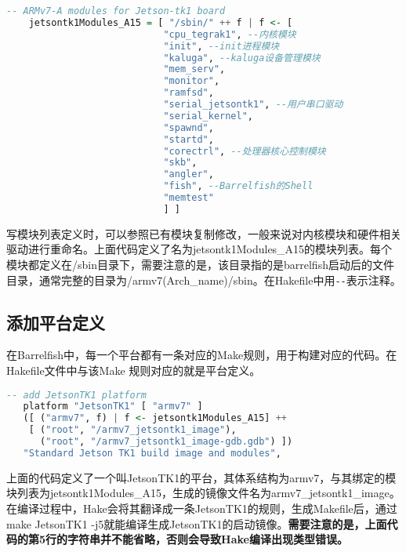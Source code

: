 \documentclass[a4paper, 12pt]{report}
\begin{document}
    \begin{lstlisting}[language = Haskell]
    -- ARMv7-A modules for Jetson-tk1 board 
    jetsontk1Modules_A15 = [ "/sbin/" ++ f | f <- [
                            "cpu_tegrak1", --内核模块
                            "init", --init进程模块
                            "kaluga", --kaluga设备管理模块
                            "mem_serv",
                            "monitor",
                            "ramfsd",
                            "serial_jetsontk1", --用户串口驱动
                            "serial_kernel",
                            "spawnd",
                            "startd",
                            "corectrl", --处理器核心控制模块
                            "skb",
                            "angler",
                            "fish", --Barrelfish的Shell
                            "memtest"
                            ] ] 
    \end{lstlisting}
    
    写模块列表定义时，可以参照已有模块复制修改，一般来说对内核模块和硬件相关驱动进行重命名。上面代码定义了名为jetsontk1Modules\_A15的模块列表。每个模块都定义在/sbin目录下，需要注意的是，该目录指的是barrelfish启动后的文件目录，通常完整的目录为/armv7(Arch\_name)/sbin。在Hakefile中用\lstinline|--|表示注释。
    
    \subsection{添加平台定义}
    
    在Barrelfish中，每一个平台都有一条对应的Make规则，用于构建对应的代码。在Hakefile文件中与该Make
    规则对应的就是平台定义。
    
	\begin{lstlisting}[language = Haskell]
   -- add JetsonTK1 platform
   platform "JetsonTK1" [ "armv7" ]
   ([ ("armv7", f) | f <- jetsontk1Modules_A15] ++
    [ ("root", "/armv7_jetsontk1_image"),
      ("root", "/armv7_jetsontk1_image-gdb.gdb") ])
   "Standard Jetson TK1 build image and modules",
    \end{lstlisting}
    
    上面的代码定义了一个叫JetsonTK1的平台，其体系结构为armv7，与其绑定的模块列表为jetsontk1Modules\_A15，生成的镜像文件名为armv7\_jetsontk1\_image。在编译过程中，Hake会将其翻译成一条JetsonTK1的规则，生成Makefile后，通过make JetsonTK1 -j5就能编译生成JetsonTK1的启动镜像。\textbf{需要注意的是，上面代码的第5行的字符串并不能省略，否则会导致Hake编译出现类型错误。}
    
\end{document}

